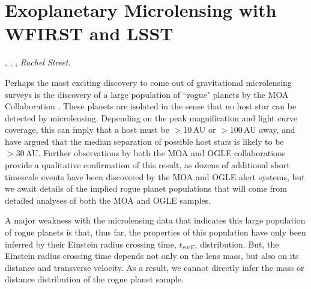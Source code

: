 %
%
%
%

\section{Exoplanetary Microlensing with WFIRST and LSST}
\def\secname{\chpname:microlensing}\label{sec:\secname}

,
,
,
{\it Rachel Street}.

Perhaps the most exciting discovery to come out of gravitational
microlensing surveys is the discovery of a large population of ``rogue"
planets by the MOA Collaboration \citep{2011Natur.473..349S}. These planets
are isolated in the sense that no host star can be detected
by microlensing. Depending on the peak magnification and light curve
coverage, this can imply that a host must be $> 10\,$AU or $> 100\,$AU away,
and \citet{2012ApJ...757..119B} have argued that the median separation
of possible host stars is likely to be $> 30\,$AU.
Further observations by both the MOA and OGLE collaborations provide
a qualitative confirmation of this result, as dozens of additional
short timescale events have been discovered by the MOA and OGLE
alert systems, but we await details of the implied rogue planet
populations that will come from detailed analyses of both the MOA
and OGLE samples.

A major weakness with the microlensing data that indicates this
large population of rogue planets is that, thus far, the properties
of this population have only been inferred by their Einstein radius
crossing time, $t_{rm E}$, distribution. But, the Einstein radius crossing
time depends not only on the lens mass, but also on its distance and
transverse velocity. As a result, we cannot directly infer the mass or distance
distribution of the rogue planet sample.

